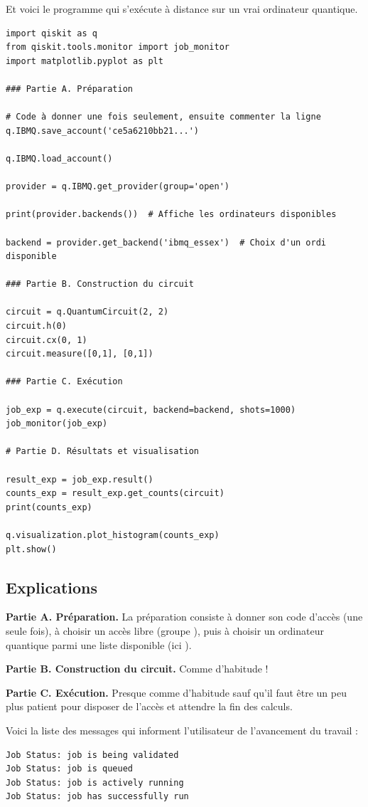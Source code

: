 \documentclass[11pt,class=report,crop=false]{standalone}
\begin{document}
Et voici le programme qui s'exécute à distance sur un vrai ordinateur quantique.
\begin{lstlisting}
import qiskit as q
from qiskit.tools.monitor import job_monitor
import matplotlib.pyplot as plt

### Partie A. Préparation

# Code à donner une fois seulement, ensuite commenter la ligne
q.IBMQ.save_account('ce5a6210bb21...')

q.IBMQ.load_account()

provider = q.IBMQ.get_provider(group='open')

print(provider.backends())  # Affiche les ordinateurs disponibles

backend = provider.get_backend('ibmq_essex')  # Choix d'un ordi disponible

### Partie B. Construction du circuit

circuit = q.QuantumCircuit(2, 2)
circuit.h(0)
circuit.cx(0, 1)
circuit.measure([0,1], [0,1])

### Partie C. Exécution 

job_exp = q.execute(circuit, backend=backend, shots=1000)
job_monitor(job_exp)

# Partie D. Résultats et visualisation

result_exp = job_exp.result()
counts_exp = result_exp.get_counts(circuit)
print(counts_exp)

q.visualization.plot_histogram(counts_exp)
plt.show()
\end{lstlisting}


\subsection{Explications}

\textbf{Partie A. Préparation.} La préparation consiste à donner son code d'accès (une seule fois), à choisir un accès libre (groupe ), puis à choisir un ordinateur quantique parmi une liste disponible (ici ).

\textbf{Partie B. Construction du circuit.} Comme d'habitude !

\textbf{Partie C. Exécution.} Presque comme d'habitude sauf qu'il faut être un peu plus patient pour disposer de l'accès et attendre la fin des calculs.

Voici la liste des messages qui informent l'utilisateur de l'avancement du travail :
\begin{lstlisting}
Job Status: job is being validated
Job Status: job is queued
Job Status: job is actively running
Job Status: job has successfully run
\end{lstlisting}
\end{document}
